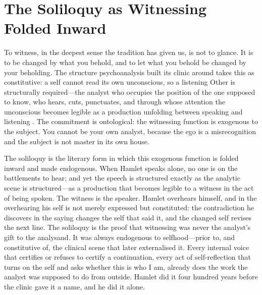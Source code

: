 \documentclass[11pt]{article}
\begin{document}
\section{The Soliloquy as Witnessing Folded Inward}

To witness, in the deepest sense the tradition has given us, is not to glance. It is to be changed by what you behold, and to let what you behold be changed by your beholding. The structure psychoanalysis built its clinic around takes this as constitutive: a self cannot read its own unconscious, so a listening Other is structurally required---the analyst who occupies the position of the one supposed to know, who hears, cuts, punctuates, and through whose attention the unconscious becomes legible as a production unfolding between speaking and listening \cite{lacan1977, lacan2006}. The commitment is ontological: the witnessing function is exogenous to the subject. You cannot be your own analyst, because the ego is a misrecognition and the subject is not master in its own house.

The soliloquy is the literary form in which this exogenous function is folded inward and made endogenous. When Hamlet speaks alone, no one is on the battlements to hear; and yet the speech is structured exactly as the analytic scene is structured---as a production that becomes legible to a witness in the act of being spoken. The witness is the speaker. Hamlet overhears himself, and in the overhearing his self is not merely expressed but constituted: the contradiction he discovers in the saying changes the self that said it, and the changed self revises the next line. The soliloquy is the proof that witnessing was never the analyst's gift to the analysand. It was always endogenous to selfhood---prior to, and constitutive of, the clinical scene that later externalised it. Every internal voice that certifies or refuses to certify a continuation, every act of self-reflection that turns on the self and asks whether this is who I am, already does the work the analyst was supposed to do from outside. Hamlet did it four hundred years before the clinic gave it a name, and he did it alone.
\end{document}
